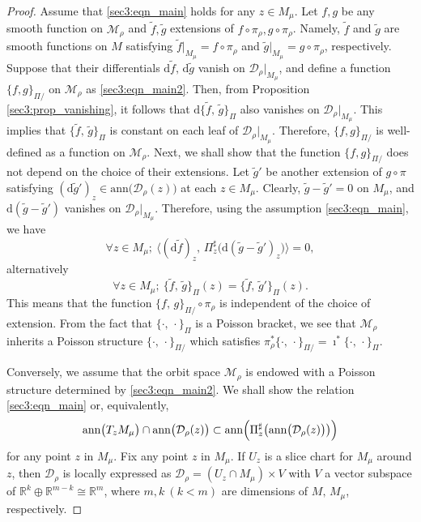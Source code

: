 \documentclass[10pt,a4paper]{amsart}
\begin{document}
\begin{proof}
Assume that \eqref{sec3:eqn_main} holds for any $z\in M_{\mu}$. Let $f,g$ be any smooth function on $\mathcal{M}_{\rho}$ 
and $\tilde{f}, \tilde{g}$ extensions of $f\circ\pi_{\rho}, g\circ\pi_{\rho}$. 
Namely, $\tilde{f}$ and $\tilde{g}$ are smooth functions on $M$ satisfying $\tilde{f}|_{M_{\mu}}=f\circ\pi_{\rho}$ and $\tilde{g}|_{M_{\mu}}=g\circ\pi_{\rho}$, respectively. 
Suppose that their differentials $\mathrm{d}\tilde{f},\,\mathrm{d}\tilde{g}$ vanish on $\mathcal{D}_{\rho}|_{M_{\mu}}$, and 
define a function $\{f,g\}_{\Pi/}$ on $\mathcal{M}_{\rho}$ as \eqref{sec3:eqn_main2}. 
Then, from Proposition \ref{sec3:prop_vanishing}, it follows that $\mathrm{d}\{\tilde{f},\,\tilde{g}\}_{\Pi}$ also vanishes on $\mathcal{D}_{\rho}|_{M_{\mu}}$. 
This implies that $\{\tilde{f},\,\tilde{g}\}_{\Pi}$ is constant on each leaf of $\mathcal{D}_{\rho}|_{M_{\mu}}$. Therefore, $\{f,g\}_{\Pi/}$ is well-defined as a function on $\mathcal{M}_{\rho}$. 
Next, we shall show that the function $\{f,g\}_{\Pi/}$ does not depend on the choice of their extensions. 
Let $\tilde{g}'$ be another extension of $g\circ\pi$ satisfying $(\mathrm{d}\tilde{g}')_z\in \mathrm{ann}\bigl(\mathcal{D}_{\rho}(z)\bigr)$ at each $z\in M_{\mu}$. 
Clearly, $\tilde{g}-\tilde{g}'=0$ on $M_{\mu}$, and $\mathrm{d}(\tilde{g}-\tilde{g}')$ vanishes on $\mathcal{D}_{\rho}|_{M_{\mu}}$. 
Therefore, using the assumption \eqref{sec3:eqn_main}, we have 
\[
\forall z\in M_{\mu};\ \bigl\langle (\mathrm{d}\tilde{f})_z,\, \Pi^{\sharp}_z\bigl(\mathrm{d}(\tilde{g}-\tilde{g}')_z\bigr)\bigr\rangle = 0, 
\]
alternatively 
\[
\forall z\in M_{\mu};\ \{\tilde{f},\,\tilde{g}\}_{\Pi}(z) = \{\tilde{f},\,\tilde{g}'\}_{\Pi}(z). 
\]
This means that the function $\{f,\,g\}_{\Pi/}\circ\pi_{\rho}$ is independent of the choice of extension. From the fact that $\{\cdot,\,\cdot\}_{\Pi}$ is a Poisson bracket, 
we see that $\mathcal{M}_{\rho}$ inherits a Poisson structure $\{\cdot,\,\cdot\}_{\Pi/}$ which satisfies $\pi_{\rho}^*\{\cdot,\,\cdot\}_{\Pi/}=\imath^*\{\cdot,\,\cdot\}_{\Pi}$. 

Conversely, we assume that the orbit space $\mathcal{M}_{\rho}$ is endowed with a Poisson structure determined by \eqref{sec3:eqn_main2}. 
We shall show the relation \eqref{sec3:eqn_main} or, equivalently, 
\begin{equation}\label{sec3:eqn_proof}
\mathrm{ann}\bigl(T_zM_{\mu}\bigr) \cap \mathrm{ann}\bigl(\mathcal{D}_{\rho}(z)\bigr)\subset \mathrm{ann}\Bigl(\Pi_z^{\sharp}\bigl(\mathrm{ann}\bigl(\mathcal{D}_{\rho}(z)\bigr)\bigr)\Bigr) 
\end{equation}
for any point $z$ in $M_{\mu}$. Fix any point $z$ in $M_{\mu}$. 
If $U_z$ is a slice chart for $M_{\mu}$ around $z$, then $\mathcal{D}_{\rho}$ is locally expressed as $\mathcal{D}_{\rho}=(U_z\cap M_{\mu})\times V$ with $V$ a vector subspace of 
$\mathbb{R}^k\oplus\mathbb{R}^{m-k}\cong \mathbb{R}^m$, where $m, k~(k<m)$ are dimensions of $M,\,M_{\mu}$, respectively. 


\end{proof}
\end{document}
